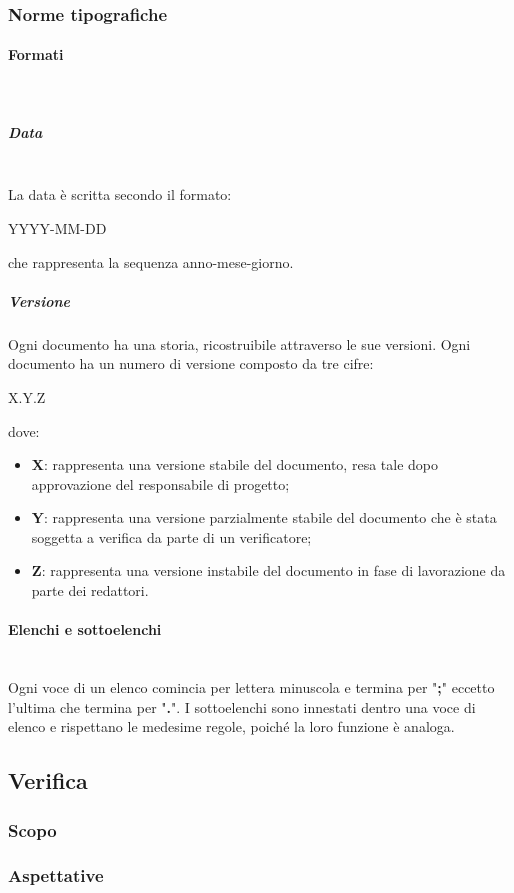 		\subsubsection{Norme tipografiche}
			\paragraph{Formati} \mbox{}\\
			\subparagraph{Data} \mbox{}\\
			La data è scritta secondo il formato:\newline
			\centerline{YYYY-MM-DD}\newline
			che rappresenta la sequenza anno-mese-giorno.
			\subparagraph{Versione}
			Ogni documento ha una storia, ricostruibile attraverso le sue versioni. Ogni documento ha un numero di versione composto da tre cifre:
			\begin{center}
				X.Y.Z
			\end{center}
			dove:
			\begin{itemize}
				\item \textbf{X}: rappresenta una versione stabile del documento, resa tale dopo approvazione del responsabile di progetto;
				\item \textbf{Y}: rappresenta una versione parzialmente stabile del documento che è stata soggetta a verifica da parte di un verificatore;
				\item \textbf{Z}: rappresenta una versione instabile del documento in fase di lavorazione da parte dei redattori.
			\end{itemize}
			\paragraph{Elenchi e sottoelenchi} \mbox{}\\
			Ogni voce di un elenco comincia per lettera minuscola e termina per "\textbf{;}" eccetto l'ultima che termina per "\textbf{.}". I sottoelenchi sono innestati dentro una voce di elenco e rispettano le medesime regole, poiché la loro funzione è analoga.
	\subsection{Verifica}
	\subsubsection{Scopo}
	\subsubsection{Aspettative}

